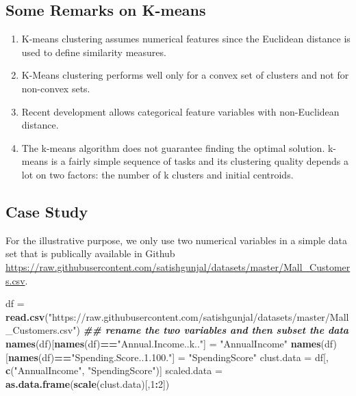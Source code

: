 \documentclass[
]{book}
\newenvironment{Shaded}{\begin{snugshade}}{\end{snugshade}}
\newcommand{\DecValTok}[1]{\textcolor[rgb]{0.00,0.00,0.81}{#1}}
\newcommand{\DocumentationTok}[1]{\textcolor[rgb]{0.56,0.35,0.01}{\textbf{\textit{#1}}}}
\newcommand{\FunctionTok}[1]{\textcolor[rgb]{0.13,0.29,0.53}{\textbf{#1}}}
\newcommand{\NormalTok}[1]{#1}
\newcommand{\OtherTok}[1]{\textcolor[rgb]{0.56,0.35,0.01}{#1}}
\newcommand{\SpecialCharTok}[1]{\textcolor[rgb]{0.81,0.36,0.00}{\textbf{#1}}}
\newcommand{\StringTok}[1]{\textcolor[rgb]{0.31,0.60,0.02}{#1}}
\begin{document}
\hypertarget{some-remarks-on-k-means}{%
\subsection{Some Remarks on K-means}\label{some-remarks-on-k-means}}

\begin{enumerate}
\def\labelenumi{\arabic{enumi}.}
\item
  K-means clustering assumes numerical features since the Euclidean distance is used to define similarity measures.
\item
  K-Means clustering performs well only for a convex set of clusters and not for non-convex sets.
\item
  Recent development allows categorical feature variables with non-Euclidean distance.
\item
  The k-means algorithm does not guarantee finding the optimal solution. k-means is a fairly simple sequence of tasks and its clustering quality depends a lot on two factors: the number of k clusters and initial centroids.
\end{enumerate}

\hypertarget{case-study}{%
\subsection{Case Study}\label{case-study}}

For the illustrative purpose, we only use two numerical variables in a simple data set that is publically available in Github \url{https://raw.githubusercontent.com/satishgunjal/datasets/master/Mall_Customers.csv}.

\begin{Shaded}
\begin{Highlighting}[]
\NormalTok{df }\OtherTok{=} \FunctionTok{read.csv}\NormalTok{(}\StringTok{"https://raw.githubusercontent.com/satishgunjal/datasets/master/Mall\_Customers.csv"}\NormalTok{)}
\DocumentationTok{\#\# rename the two variables and then subset the data}
\FunctionTok{names}\NormalTok{(df)[}\FunctionTok{names}\NormalTok{(df)}\SpecialCharTok{==}\StringTok{"Annual.Income..k.."}\NormalTok{] }\OtherTok{=} \StringTok{"AnnualIncome"}
\FunctionTok{names}\NormalTok{(df)[}\FunctionTok{names}\NormalTok{(df)}\SpecialCharTok{==}\StringTok{"Spending.Score..1.100."}\NormalTok{] }\OtherTok{=} \StringTok{"SpendingScore"}
\NormalTok{clust.data }\OtherTok{=}\NormalTok{ df[, }\FunctionTok{c}\NormalTok{(}\StringTok{"AnnualIncome"}\NormalTok{, }\StringTok{"SpendingScore"}\NormalTok{)]}
\NormalTok{scaled.data }\OtherTok{=} \FunctionTok{as.data.frame}\NormalTok{(}\FunctionTok{scale}\NormalTok{(clust.data)[,}\DecValTok{1}\SpecialCharTok{:}\DecValTok{2}\NormalTok{])}
\end{Highlighting}
\end{Shaded}
\end{document}
